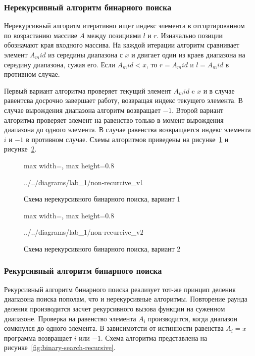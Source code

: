 \documentclass{bmstu}
\begin{document}
\subsubsection{Нерекурсивный алгоритм бинарного поиска}
Нерекурсивный алгоритм итеративно ищет индекс элемента в отсортированном
по возрастанию массиве $A$ между позициями $l$ и $r$. Изначально позиции обозначают
края входного массива. На каждой итерации алгоритм сравнивает элемент $A_mid$ из середины диапазона с
$x$ и двигает один из краев диапазона на середину диапазона, сужая его. Если
$A_mid < x$, то $r = A_mid$ и $l = A_mid$ в противном случае.

Первый вариант алгоритма проверяет текущий элемент $A_mid$ c $x$ и в случае равентсва
досрочно завершает работу, возвращая индекс текущего элемента. В случае
вырождения диапазона алгоритм возвращает $-1$. Второй вариант алгоритма
проверяет элемент на равенство только в момент вырождения диапазона до одного
элемента. В случае равенства возвращается индекс элемента $i$ и $-1$ в противном
случае. Схемы алгоритмов приведены на рисунке~\ref{fig:binary-search-iterative-v1}
и рисунке~\ref{fig:binary-search-iterative-v2}.

\begin{figure}[H]
	\centering
	\begin{adjustbox}{max width=\textwidth, max height=0.8\textheight}
		
		{../../diagrams/lab_1/non-recurcive_v1}
	\end{adjustbox}
	\caption{Схема нерекурсивного бинарного поиска, вариант 1}
	\label{fig:binary-search-iterative-v1}
\end{figure}

\begin{figure}[H]
	\centering
	\begin{adjustbox}{max width=\textwidth, max height=0.8\textheight}
		
		{../../diagrams/lab_1/non-recurcive_v2}
	\end{adjustbox}
	\caption{Схема нерекурсивного бинарного поиска, вариант 2}
	\label{fig:binary-search-iterative-v2}
\end{figure}

\subsubsection{Рекурсивный алгоритм бинарного поиска}
Рекурсивный алгоритм бинарного поиска реализует тот-же принцип деления диапазона
поиска пополам, что и нерекурсивные алгоритмы. Повторение раунда деления
производится засчет рекурсивного вызова функции на суженном диапазоне. Проверка
на равенство элемента $A_i$ производится, когда диапазон сомкнулся до одного
элемента. В зависимотсти от истинности равенства $A_i = x$ программа возвращает
$i$ или $-1$. Схема алгоритма представлена на рисунке~\ref{fig:binary-search-recursive}.
\end{document}

